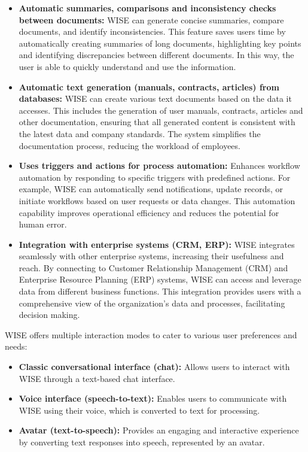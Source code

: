 \begin{itemize}
    \item \textbf{Automatic summaries, comparisons and inconsistency checks between documents:} WISE can generate concise summaries, compare documents, and identify inconsistencies. This feature saves users time by automatically creating summaries of long documents, highlighting key points and identifying discrepancies between different documents. In this way, the user is able to quickly understand and use the information.
    
    \item \textbf{Automatic text generation (manuals, contracts, articles) from databases:} WISE can create various text documents based on the data it accesses. This includes the generation of user manuals, contracts, articles and other documentation, ensuring that all generated content is consistent with the latest data and company standards. The system simplifies the documentation process, reducing the workload of employees.
    
    \item \textbf{Uses triggers and actions for process automation:} Enhances workflow automation by responding to specific triggers with predefined actions. For example, WISE can automatically send notifications, update records, or initiate workflows based on user requests or data changes. This automation capability improves operational efficiency and reduces the potential for human error.
    
    \item \textbf{Integration with enterprise systems (CRM, ERP):} WISE integrates seamlessly with other enterprise systems, increasing their usefulness and reach. By connecting to Customer Relationship Management (CRM) and Enterprise Resource Planning (ERP) systems, WISE can access and leverage data from different business functions. This integration provides users with a comprehensive view of the organization's data and processes, facilitating decision making. \cite{hpa2024}
\end{itemize}

WISE offers multiple interaction modes to cater to various user preferences and needs:

\begin{itemize}
    \item \textbf{Classic conversational interface (chat):} Allows users to interact with WISE through a text-based chat interface.
    \item \textbf{Voice interface (speech-to-text):} Enables users to communicate with WISE using their voice, which is converted to text for processing.
    \item \textbf{Avatar (text-to-speech):} Provides an engaging and interactive experience by converting text responses into speech, represented by an avatar.
\end{itemize}

